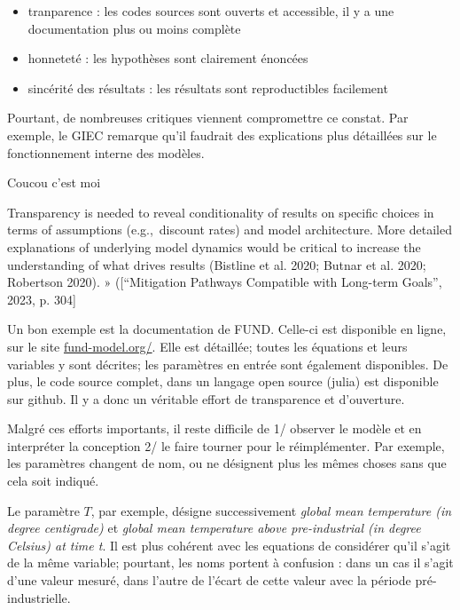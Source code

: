 \begin{itemize}
    \item tranparence : les codes sources sont ouverts et accessible, il y a une documentation plus ou moins complète
    \item honneteté : les hypothèses sont clairement énoncées
    \item sincérité des résultats : les résultats sont reproductibles facilement
\end{itemize}

Pourtant, de nombreuses critiques viennent compromettre ce constat. Par exemple, le GIEC remarque qu'il faudrait des explications plus détaillées sur le fonctionnement interne des modèles. 


\begin{displayquote}
    Coucou c'est moi
\end{displayquote}
\begin{displayquote}
Transparency is needed to reveal conditionality of results on specific choices in terms of assumptions (e.g., discount rates) and model architecture. More detailed explanations of underlying model dynamics would be critical to increase the understanding of what drives results (Bistline et al. 2020; Butnar et al. 2020; Robertson 2020). » ([“Mitigation Pathways Compatible with Long-term Goals”, 2023, p. 304]
\end{displayquote}
Un bon exemple est la documentation de FUND. Celle-ci est disponible en ligne, sur le site \href{http://www.fund-model.org/}{fund-model.org/}. Elle est détaillée; toutes les équations et leurs variables y sont décrites; les paramètres en entrée sont également disponibles. De plus, le code source complet, dans un langage open source (julia) est disponible sur github. Il y a donc un véritable effort de transparence et d'ouverture. 

Malgré ces efforts importants, il reste difficile de 1/ observer le modèle et en interpréter la conception 2/ le faire tourner pour le réimplémenter.  Par exemple, les paramètres changent de nom, ou ne désignent plus les mêmes choses sans que cela soit indiqué.

Le paramètre $T$, par exemple, désigne successivement \emph{ global mean temperature (in degree centigrade)} et \emph{global mean temperature above pre-industrial (in degree Celsius) at time t}. Il est plus cohérent avec les equations de considérer qu'il s'agit de la même variable; pourtant, les noms portent à confusion : dans un cas il s'agit d'une valeur mesuré, dans l'autre de l'écart de cette valeur avec la période pré-industrielle. 

